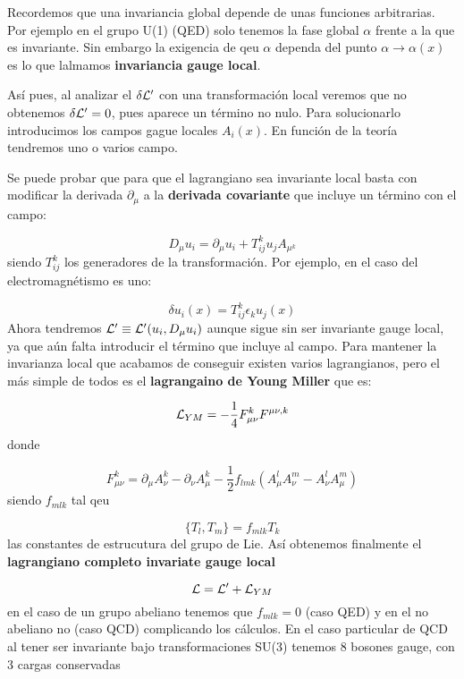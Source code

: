 Recordemos que una invariancia global depende de unas funciones arbitrarias. Por ejemplo en el grupo U(1) (QED) solo tenemos la fase global $\alpha$ frente a la que es invariante. Sin embargo la exigencia de qeu $\alpha$ dependa del punto $\alpha \to \alpha(x)$ es lo que lalmamos \textbf{invariancia gauge local}.

Así pues, al analizar el $\delta \mathcal{L}'$ con una transformación local veremos que no obtenemos $\delta \mathcal{L}'=0$, pues aparece un término no nulo. Para solucionarlo introducimos los campos gague locales $A_i(x)$. En función de la teoría tendremos uno o varios campo. 

Se puede probar que para que el lagrangiano sea invariante local basta con modificar la derivada $\partial_\mu$ a la \textbf{derivada covariante} que incluye un término con el campo:

\begin{equation}
    D_\mu u_i = \partial_\mu u_i + T_{ij}^k u_j A_{\mu^k}
\end{equation}
siendo $T_{ij}^k$ los generadores de la transformación. Por ejemplo, en el caso del electromagnétismo es uno:

\begin{equation}
    \delta u_i (x) = T_{ij}^k \epsilon_k u_j (x)
\end{equation}
Ahora tendremos $\mathcal{L}'\equiv \mathcal{L}'(u_i,D_\mu u_i)$ aunque sigue sin ser invariante gauge local, ya que aún falta introducir el término que incluye al campo. Para mantener la invarianza local que acabamos de conseguir existen varios lagrangianos, pero el más simple de todos es el \textbf{lagrangaino de Young Miller} que es:


\begin{equation}
    \mathcal{L}_{YM} = - \frac{1}{4} F_{\mu \nu}^k F^{\mu \nu, k}
\end{equation}
donde 

\begin{equation}
    F_{\mu \nu}^k  = \partial_\mu A_\nu^k - \partial_\nu A_\mu^k - \frac{1}{2} f_{lmk} (A_{\mu}^l A_{\nu}^m - A_{\nu}^l A_{\mu}^m)
\end{equation}
siendo $f_{mlk}$ tal qeu 

\begin{equation}
    \{ T_l , T_m \} =f_{mlk} T_k 
\end{equation}
las constantes de estrucutura del grupo de Lie. Así obtenemos finalmente el \textbf{lagrangiano completo invariate gauge local}

\begin{equation}
    \mathcal{L} = \mathcal{L}' + \mathcal{L}_{YM}
\end{equation}
en el caso de un grupo abeliano tenemos que $f_{mlk}=0$ (caso QED) y en el no abeliano no (caso QCD) complicando los cálculos. En el caso particular de QCD al tener ser invariante bajo transformaciones SU(3) tenemos 8 bosones gauge, con 3 cargas conservadas


